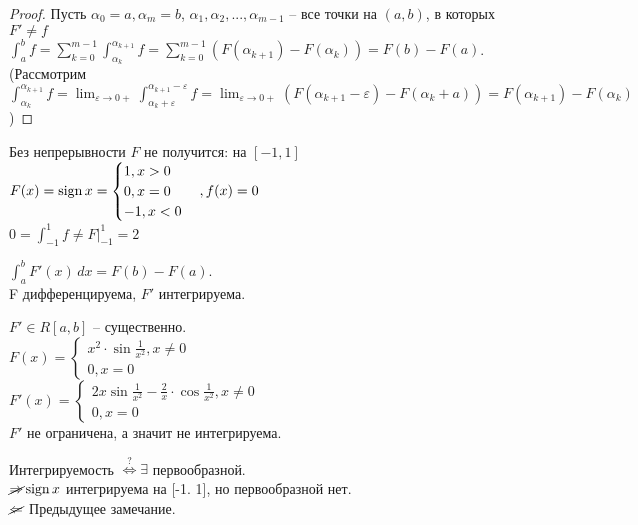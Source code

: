 \begin{proof} 
	Пусть $\alpha_0 = a, \alpha_m = b$, $\alpha_1, \alpha_2, ..., \alpha_{m-1}$ -- все точки на $(a,b)$, в которых $F' \neq f$
	$\displaystyle \int_{a}^{b} f = \sum_{k=0}^{m-1} \int_{\alpha_k}^{\alpha_{k+1}} f = \sum_{k=0}^{m-1} (F(\alpha_{k+1}) - F(\alpha_k)) = F(b) - F(a)$.\\
	(Рассмотрим $\displaystyle \int_{\alpha_k}^{\alpha_{k+1}} f = \lim_{\varepsilon \to	0+} \int_{\alpha_k+\varepsilon}^{\alpha_{k+1}
	 - \varepsilon} f =\lim_{\varepsilon \to 0+} (F(\alpha_{k+1} - \varepsilon) - F(\alpha_k + a)) = F(\alpha_{k+1}) - F(\alpha_k)$)
\end{proof}

\begin{Remark}
	Без непрерывности $F$ не получится: на $[-1,1]$\\
	$ F(x) = \operatorname{sign} x = 
	\begin{cases}
		1, x>0\\
		0, x = 0\\
		-1, x<0	
	\end{cases}, f(x) = 0$\\
	$\displaystyle 0 = \int_{-1}^{1} f \neq F \Big|^1_{-1} = 2$
\end{Remark}

\begin{Rem}
	$\displaystyle \int_{a}^{b} F'(x)\,dx = F(b) - F(a)$.\\ F дифференцируема, $F'$ интегрируема. 
\end{Rem}

\begin{Rem}
	$F' \in R[a, b]$ -- существенно.\\
	$F(x) = \begin{cases}
		x^2 \cdot \sin \frac{1}{x^2}, x \neq 0\\
		0, x = 0
	\end{cases}$\\

	$\displaystyle F'(x) = 
	\begin{cases}
		2x \sin \frac{1}{x^2} - \frac{2}{x} \cdot \cos \frac{1}{x^2}, x \neq 0 \\
		0, x = 0
	\end{cases}$\\ $F'$ не ограничена, а значит не интегрируема.
\end{Rem}

\begin{Rem}
	Интегрируемость $\overset{?}{\Leftrightarrow} \exists$ первообразной.\\
	$\cancel{\Rightarrow} \operatorname{sign} x$ интегрируема на [-1. 1], но первообразной нет.\\
	$\cancel{\Leftarrow}$ Предыдущее замечание.   
\end{Rem}

